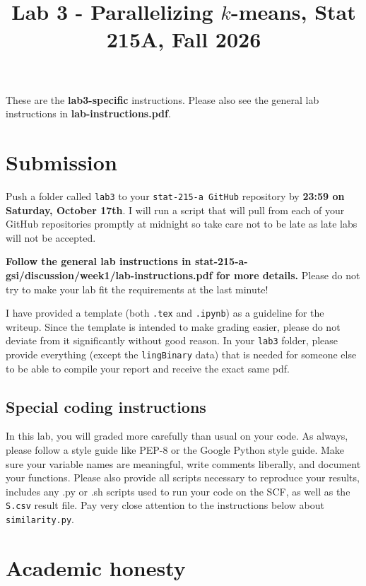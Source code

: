 \documentclass[letterpaper,12pt]{article}
\title{Lab 3 - Parallelizing $k$-means, Stat 215A, Fall 2026\vspace{-2em}}
\date{}
\begin{document}
\maketitle

These are the \textbf{lab3-specific} instructions. Please also see the general lab instructions in \textbf{lab-instructions.pdf}.

\tableofcontents

\section{Submission}
Push a folder called \texttt{lab3} to your \texttt{stat-215-a GitHub} repository by \textbf{23:59 on Saturday, October 17th}. I will run a script that will pull from each of your GitHub repositories promptly at midnight so take care not to be late as late labs will not be accepted.

\textbf{Follow the general lab instructions in stat-215-a-gsi/discussion/week1/lab-instructions.pdf for more details.} Please do not try to make your lab fit the requirements at the last minute!

I have provided a template (both \texttt{.tex} and \texttt{.ipynb}) as a guideline for the writeup. Since the template is intended to make grading easier, please do not deviate from it significantly without good reason. In your \texttt{lab3} folder, please provide everything (except the \texttt{lingBinary} data) that is needed for someone else to be able to compile your report and receive the exact same pdf.

\subsection{Special coding instructions}
In this lab, you will graded more carefully than usual on your code. As always, please follow a style guide like PEP-8 or the Google Python style guide. Make sure your variable names are meaningful, write comments liberally, and document your functions. Please also provide all scripts necessary to reproduce your results, includes any .py or .sh scripts used to run your code on the SCF, as well as the \texttt{S.csv} result file. Pay very close attention to the instructions below about \texttt{similarity.py}.

\section{Academic honesty}
\end{document}
